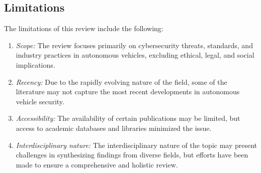 \subsection{Limitations}\label{subsec:limitations}

The limitations of this review include the following:
\begin{enumerate}
    \item \textit{Scope:} The review focuses primarily on cybersecurity threats, standards, and industry practices in autonomous vehicles, excluding ethical, legal, and social implications.
    \item \textit{Recency:} Due to the rapidly evolving nature of the field, some of the literature may not capture the most recent developments in autonomous vehicle security.
    \item \textit{Accessibility:} The availability of certain publications may be limited, but access to academic databases and libraries minimized the issue.
    \item \textit{Interdisciplinary nature:} The interdisciplinary nature of the topic may present challenges in synthesizing findings from diverse fields, but efforts have been made to ensure a comprehensive and holistic review.
\end{enumerate}

\newpage

